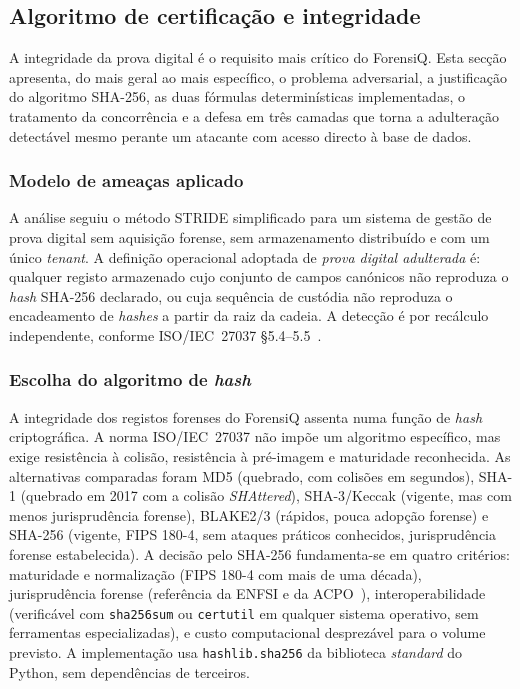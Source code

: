 \subsection{Algoritmo de certificação e integridade}
\label{sec:certificacao}

A integridade da prova digital é o requisito mais crítico do
ForensiQ. Esta secção apresenta, do mais geral ao mais específico, o
problema adversarial, a justificação do algoritmo SHA-256, as duas
fórmulas determinísticas implementadas, o tratamento da concorrência
e a defesa em três camadas que torna a adulteração detectável mesmo
perante um atacante com acesso directo à base de dados.

\subsubsection{Modelo de ameaças aplicado}
\label{sec:threat-model}

A análise seguiu o método STRIDE simplificado para um sistema de
gestão de prova digital sem aquisição forense, sem armazenamento
distribuído e com um único \emph{tenant}. A definição operacional
adoptada de \emph{prova digital adulterada} é: qualquer registo
armazenado cujo conjunto de campos canónicos não reproduza o
\emph{hash} SHA-256 declarado, ou cuja sequência de custódia não
reproduza o encadeamento de \emph{hashes} a partir da raiz da cadeia.
A detecção é por recálculo independente, conforme ISO/IEC~27037
\S5.4--5.5~\citep{iso27037}.

\subsubsection{Escolha do algoritmo de \emph{hash}}
\label{sec:hash-choice}

A integridade dos registos forenses do ForensiQ assenta numa função
de \emph{hash} criptográfica. A norma ISO/IEC~27037 não impõe um
algoritmo específico, mas exige resistência à colisão, resistência à
pré-imagem e maturidade reconhecida. As alternativas comparadas
foram MD5 (quebrado, com colisões em segundos), SHA-1 (quebrado em
2017 com a colisão \emph{SHAttered}), SHA-3/Keccak (vigente, mas com
menos jurisprudência forense), BLAKE2/3 (rápidos, pouca adopção
forense) e SHA-256 (vigente, FIPS 180-4, sem ataques práticos
conhecidos, jurisprudência forense estabelecida). A decisão pelo
SHA-256 fundamenta-se em quatro critérios: maturidade e normalização
(FIPS 180-4 com mais de uma década), jurisprudência forense
(referência da ENFSI e da ACPO~\citep{acpo2012}), interoperabilidade
(verificável com \texttt{sha256sum} ou \texttt{certutil} em qualquer
sistema operativo, sem ferramentas especializadas), e custo
computacional desprezável para o volume previsto. A implementação
usa \texttt{hashlib.sha256} da biblioteca \emph{standard} do Python,
sem dependências de terceiros.

